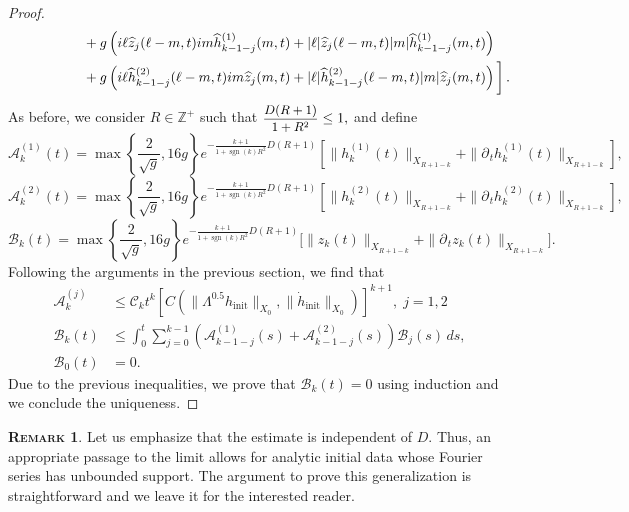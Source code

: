 \documentclass[11pt]{article}
\theoremstyle{plain}
\theoremstyle{definition}
\newtheorem{remark}{\scshape Remark}
\theoremstyle{definition}
\def\bbZ{{\mathbb Z}}
\def\p{\text{\bf\emph{p}}}
\DeclareMathOperator{\sgn}{sgn}
\def\ft #1{{\widehat{#1}}}
\def\p{{\partial\hspace{1pt}}}
\def\smallexp#1{{\text{\small #1}}}
\def\dfrac#1#2{\smallexp{$\displaystyle{}\frac{#1}{#2}$}}
\def\hinit{h_{\operatorname{init}}}
\def\htinit{{\dot h}_{\operatorname{init}}}
\begin{document}
\begin{proof}
\begin{align*}
&\qquad\qquad\quad\ +g\left( i\ell\ft{z}_j(\ell-m,t)im \ft{h}^{(1)}_{k-1-j}(m,t) +
|\ell|\ft{z}_j(\ell-m,t)|m|\ft{h}^{(1)}_{k-1-j}(m,t) \right)\nonumber\\
&\qquad\qquad\quad\ +g\left( i\ell\ft{h}^{(2)}_{k-1-j}(\ell-m,t)im \ft{z}_j(m,t) +
|\ell|\ft{h}^{(2)}_{k-1-j}(\ell-m,t)|m|\ft{z}_j(m,t) \right) \bigg{]}\,.
\end{align*}
As before, we consider $R\in \bbZ^+$ such that $\dfrac{D(R+1)}{1+R^2}\leq 1,$ and define
$$
\mathscr{A}^{(1)}_k(t)=\max\left\{\frac{2}{\sqrt{g}},16g\right\}e^{-\frac{k+1}{1+\sgn(k)R^2}D(R+1)}\left[\|h_k^{(1)}(t)\|_{X_{R+1-k}}+\|\p_{\!t} h_k^{(1)}(t)\|_{X_{R+1-k}}\right],
$$
$$
\mathscr{A}^{(2)}_k(t)=\max\left\{\frac{2}{\sqrt{g}},16g\right\}e^{-\frac{k+1}{1+\sgn(k)R^2}D(R+1)}\left[\|h_k^{(2)}(t)\|_{X_{R+1-k}}+\|\p_{\!t} h_k^{(2)}(t)\|_{X_{R+1-k}}\right],
$$
$$
\mathscr{B}_k(t)=\max\left\{\frac{2}{\sqrt{g}},16g\right\}e^{-\frac{k+1}{1+\sgn(k)R^2}D(R+1)}\big[\|z_k(t)\|_{X_{R+1-k}}+\|\p_{\!t} z_k(t)\|_{X_{R+1-k}}\big].
$$
Following the arguments in the previous section, we find that
\begin{align*}
\mathscr{A}^{(j)}_k&\leq  \mathcal{C}_kt^k\left[C(\|\Lambda^{0.5}\hinit\|_{X_0},\|\htinit\|_{X_0})\right]^{k+1},\;j=1,2\\
\mathscr{B}_k(t)&\leq \int_0^t \sum_{j=0}^{k-1} \left(\mathscr{A}^{(1)}_{k-1-j}(s)+\mathscr{A}^{(2)}_{k-1-j}(s)\right)\mathscr{B}_{j}(s) \,ds,\\
\mathscr{B}_0(t)&=0.
\end{align*}
Due to the previous inequalities, we prove that $\mathscr{B}_k(t)=0$ using induction and we conclude the uniqueness.
\end{proof}

\begin{remark}
Let us emphasize that the estimate is independent of $D$. Thus, an appropriate passage to the limit allows for analytic initial data whose Fourier series has unbounded support. The argument to prove this generalization is straightforward and we leave it for the interested reader.
\end{remark}
\end{document}
